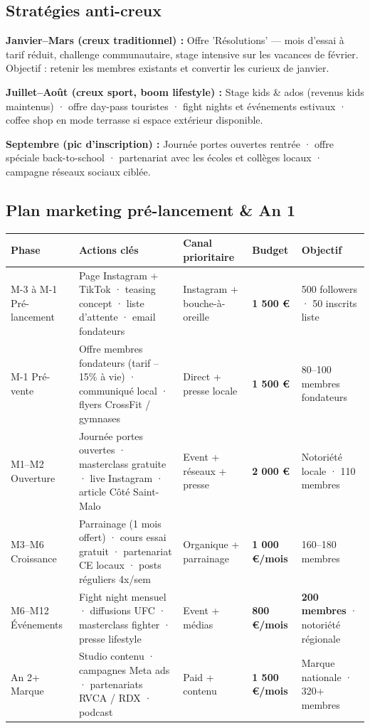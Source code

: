 \documentclass[11pt, a4paper]{article}
\newcommand{\redcell}[1]{\textcolor{fc-red}{\textbf{#1}}}
\begin{document}
\subsection{Stratégies anti-creux}

\textbf{Janvier–Mars (creux traditionnel) :} Offre 'Résolutions' — mois d'essai à tarif réduit, challenge communautaire, stage intensive sur les vacances de février. Objectif : retenir les membres existants et convertir les curieux de janvier.

\textbf{Juillet–Août (creux sport, boom lifestyle) :} Stage kids \& ados (revenus kids maintenus) · offre day-pass touristes · fight nights et événements estivaux · coffee shop en mode terrasse si espace extérieur disponible.

\textbf{Septembre (pic d'inscription) :} Journée portes ouvertes rentrée · offre spéciale back-to-school · partenariat avec les écoles et collèges locaux · campagne réseaux sociaux ciblée.

\subsection{Plan marketing pré-lancement \& An 1}

\begin{center}
\begin{tabular}{@{}p{2.5cm}p{4cm}p{2.5cm}p{2cm}p{3cm}@{}}
\toprule
\rowcolor{fc-ink}\color{white}\textbf{Phase} & \color{white}\textbf{Actions clés} & \color{white}\textbf{Canal prioritaire} & \color{white}\textbf{Budget} & \color{white}\textbf{Objectif} \\
\midrule
M-3 à M-1 Pré-lancement & Page Instagram + TikTok · teasing concept · liste d'attente · email fondateurs & Instagram + bouche-à-oreille & \redcell{1 500 €} & 500 followers · 50 inscrits liste \\
\rowcolor{fc-bg2} M-1 Pré-vente & Offre membres fondateurs (tarif –15\% à vie) · communiqué local · flyers CrossFit / gymnases & Direct + presse locale & \redcell{1 500 €} & 80–100 membres fondateurs \\
M1–M2 Ouverture & Journée portes ouvertes · masterclass gratuite · live Instagram · article Côté Saint-Malo & Event + réseaux + presse & \redcell{2 000 €} & Notoriété locale · 110 membres \\
\rowcolor{fc-bg2} M3–M6 Croissance & Parrainage (1 mois offert) · cours essai gratuit · partenariat CE locaux · posts réguliers 4x/sem & Organique + parrainage & \redcell{1 000 €/mois} & 160–180 membres \\
M6–M12 Événements & Fight night mensuel · diffusions UFC · masterclass fighter · presse lifestyle & Event + médias & \redcell{800 €/mois} & \redcell{200 membres} · notoriété régionale \\
\rowcolor{fc-bg2} An 2+ Marque & Studio contenu · campagnes Meta ads · partenariats RVCA / RDX · podcast & Paid + contenu & \redcell{1 500 €/mois} & Marque nationale · 320+ membres \\
\bottomrule
\end{tabular}
\end{center}
\end{document}
